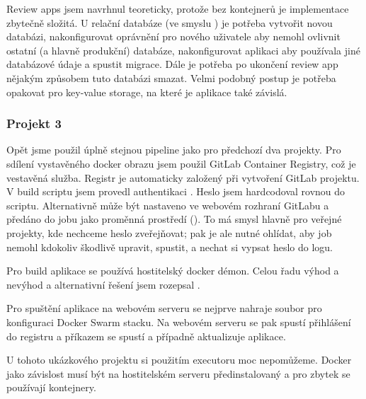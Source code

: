             Review apps jsem navrhnul teoreticky, protože bez kontejnerů je implementace zbytečně složitá. U relační databáze (ve smyslu ) je potřeba vytvořit novou databázi, nakonfigurovat oprávnění pro nového uživatele aby nemohl ovlivnit ostatní (a hlavně produkční) databáze, nakonfigurovat aplikaci aby používala jiné databázové údaje a spustit migrace. Dále je potřeba po ukončení review app nějakým způsobem tuto databázi smazat. Velmi podobný postup je potřeba opakovat pro key-value storage, na které je aplikace také závislá.

        \subsubsection{Projekt 3}
            Opět jsme použil úplně stejnou pipeline jako pro předchozí dva projekty. Pro sdílení vystavěného docker obrazu jsem použil GitLab Container Registry, což je vestavěná služba. Registr je automaticky založený při vytvoření GitLab projektu. V build scriptu jsem provedl authentikaci . Heslo jsem hardcodoval rovnou do scriptu. Alternativně může být nastaveno ve webovém rozhraní GitLabu a předáno do jobu jako proměnná prostředí (). To má smysl hlavně pro veřejné projekty, kde nechceme heslo zveřejňovat; pak je ale nutné ohlídat, aby \CI job nemohl kdokoliv škodlivě upravit, spustit, a nechat si vypsat heslo do logu.

            Pro build aplikace se používá hostitelský docker démon. Celou řadu výhod a nevýhod a alternativní řešení jsem rozepsal .

            Pro spuštění aplikace na webovém serveru se nejprve nahraje soubor pro konfiguraci Docker Swarm stacku. Na webovém serveru se pak spustí přihlášení do registru a příkazem  se spustí a případně aktualizuje aplikace.

            U tohoto ukázkového projektu si použitím  executoru moc nepomůžeme. Docker jako závislost musí být na hostitelském serveru předinstalovaný a pro zbytek se používají kontejnery.

